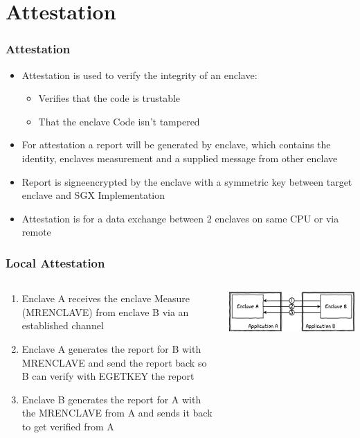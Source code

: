 \section{Attestation}
\begin{frame}
    \frametitle{Attestation}
    \begin{itemize}[<+->]
        \item Attestation is used to verify the integrity of an enclave:
        \begin{itemize}[<+->]
            \item Verifies that the code is trustable
            \item That the enclave Code isn't tampered
        \end{itemize}
        \item For attestation a report will be generated by enclave, which contains the identity, enclaves measurement and a supplied message from other enclave
        \item Report is signeencrypted by the enclave with a symmetric key between target enclave and SGX Implementation
        \item Attestation is for a data exchange between 2 enclaves on same CPU or via remote 
    \end{itemize}
\end{frame}

\begin{frame}
    \frametitle{Local Attestation}
    \begin{columns}
        \begin{column}{0.4\textwidth}
            \begin{enumerate}[<+->]
                \item Enclave A receives the enclave Measure (MRENCLAVE) from enclave B via an established channel
                \item Enclave A generates the report for B with MRENCLAVE and send the report back so B can verify with EGETKEY the report
                \item Enclave B generates the report for A with the MRENCLAVE from A and sends it back to get verified from A
            \end{enumerate}
        \end{column}
        \begin{column}{0.6\textwidth}
            \includegraphics[scale=0.45]{Images/local_attestation.png}
        \end{column}
    \end{columns}
\end{frame}

